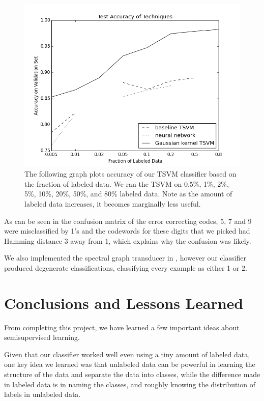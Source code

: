 \documentclass[11pt]{article}
\begin{document}
\begin{figure}
  \centering
  \caption{The following graph plots accuracy of our TSVM classifier based on the fraction of labeled data. We ran the TSVM on 0.5\%, 1\%, 2\%, 5\%, 10\%, 20\%, 50\%, and 80\% labeled data. Note as the amount of labeled data increases, it becomes marginally less useful.}
  \includegraphics[width=5in]{figure_1.png}
\end{figure}


As can be seen in the confusion matrix of the error correcting codes,
5, 7 and 9 were misclassified by 1's and the codewords for
these digits that we picked had Hamming distance 3 away from 1, which
explains why the confusion was likely.

We also implemented the spectral graph transducer in \cite{joachims2003transductive}, however our classifier
produced degenerate classifications, classifying every example as either 1 or 2.

\section{Conclusions and Lessons Learned}

From completing this project, we have learned a few important ideas about semisupervised learning. 

Given that our classifier worked well even using a tiny amount of labeled data,
one key idea we learned was that unlabeled data can be powerful in learning the structure of the data
and separate the data into classes, while the difference made in labeled data is in naming the classes,
and roughly knowing the distribution of labels in unlabeled data.
\end{document}
